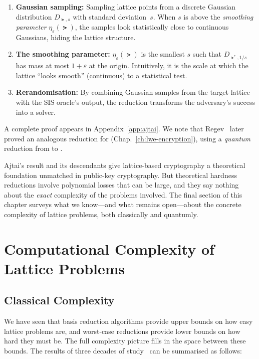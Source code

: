 \begin{enumerate}
\item \textbf{Gaussian sampling:} Sampling lattice points from a discrete Gaussian distribution $D_{\lat,s}$ with standard deviation~$s$.  When $s$ is above the \emph{smoothing parameter} $\eta_\varepsilon(\lat)$, the samples look statistically close to continuous Gaussians, hiding the lattice structure.

\item \textbf{The smoothing parameter:} $\eta_\varepsilon(\lat)$ is the smallest $s$ such that $D_{\lat^*,1/s}$ has mass at most $1+\varepsilon$ at the origin.  Intuitively, it is the scale at which the lattice ``looks smooth'' (continuous) to a statistical test.

\item \textbf{Rerandomisation:} By combining Gaussian samples from the target lattice with the \textsc{SIS} oracle's output, the reduction transforms the adversary's success into a \sivp{} solver.
\end{enumerate}

A complete proof appears in Appendix~\ref{app:ajtai}.  We note that Regev~\cite{Regev2009} later proved an analogous reduction for \lwe{} (Chap.~\ref{ch:lwe-encryption}), using a \emph{quantum} reduction from \gapsvp{} to \lwe{}.

Ajtai's result and its descendants give lattice-based cryptography a theoretical foundation unmatched in public-key cryptography.  But theoretical hardness reductions involve polynomial losses that can be large, and they say nothing about the \emph{exact} complexity of the problems involved.  The final section of this chapter surveys what we know---and what remains open---about the concrete complexity of lattice problems, both classically and quantumly.


\section{Computational Complexity of Lattice Problems}
\label{sec:lattice-complexity}

\subsection{Classical Complexity}
\label{subsec:classical-complexity}

We have seen that basis reduction algorithms provide upper bounds on how easy lattice problems are, and worst-case reductions provide lower bounds on how hard they must be.  The full complexity picture fills in the space between these bounds.  The results of three decades of study~\cite{MicciancioGoldwasser2002, Peikert2016} can be summarised as follows:

